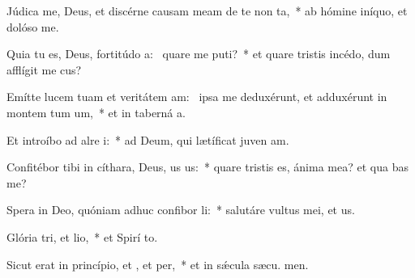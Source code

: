 \item Júdica me, Deus, et discérne causam meam de te non ta,~* ab hómine iníquo, et dolóso  me.
\item Quia tu es, Deus, fortitúdo a:~\pscross{} quare me puti?~* et quare tristis incédo, dum afflígit me cus?
\item Emítte lucem tuam et veritátem am:~\pscross{} ipsa me deduxérunt, et adduxérunt in montem tum um,~* et in taberná a.
\item Et introíbo ad alre i:~* ad Deum, qui lætíficat juven am.
\item Confitébor tibi in cíthara, Deus, us us:~* quare tristis es, ánima mea? et qua bas me?
\item Spera in Deo, quóniam adhuc confibor li:~* salutáre vultus mei, et  us.
\item Glória tri, et lio,~* et Spirí to.
\item Sicut erat in princípio, et , et per,~* et in sǽcula sæcu. men.
